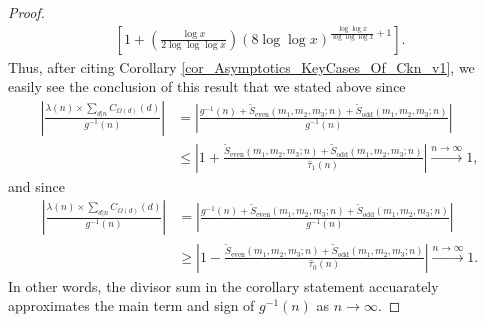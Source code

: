 \documentclass[11pt,reqno,a4letter]{article}
\numberwithin{figure}{section}
\numberwithin{table}{section}
\theoremstyle{plain}
\numberwithin{theorem}{section}
\theoremstyle{definition}
\begin{document}
\begin{proof}
\begin{align*}
     \left[1 + \left(\frac{\log x}{2 \log\log\log x}\right) 
     (8 \log\log x)^{\frac{\log\log x}{\log\log\log x} + 1}\right]. 
\end{align*} 
Thus, after citing Corollary \ref{cor_Asymptotics_KeyCases_Of_Ckn_v1}, we easily see the conclusion of this 
result that we stated above since 
\begin{align*} 
\left\lvert \frac{\lambda(n) \times \sum\limits_{d|n} C_{\Omega(d)}(d)}{g^{-1}(n)} \right\rvert & = 
     \left\lvert \frac{g^{-1}(n) + \widetilde{S}_{\operatorname{even}}(m_1, m_2, m_3; n) + 
     \widetilde{S}_{\operatorname{odd}}(m_1, m_2, m_3; n)}{g^{-1}(n)} \right\rvert \\ 
     & \leq \left\lvert 1 + \frac{\widetilde{S}_{\operatorname{even}}(m_1, m_2, m_3; n) + 
     \widetilde{S}_{\operatorname{odd}}(m_1, m_2, m_3; n)}{\widehat{\tau}_1(n)} \right\rvert 
     \xrightarrow{n \rightarrow \infty} 1, 
\end{align*} 
and since 
\begin{align*} 
\left\lvert \frac{\lambda(n) \times \sum\limits_{d|n} C_{\Omega(d)}(d)}{g^{-1}(n)} \right\rvert & = 
     \left\lvert \frac{g^{-1}(n) + \widetilde{S}_{\operatorname{even}}(m_1, m_2, m_3; n) + 
     \widetilde{S}_{\operatorname{odd}}(m_1, m_2, m_3; n)}{g^{-1}(n)} \right\rvert \\ 
     & \geq \left\lvert 1 - \frac{\widetilde{S}_{\operatorname{even}}(m_1, m_2, m_3; n) + 
     \widetilde{S}_{\operatorname{odd}}(m_1, m_2, m_3; n)}{\widehat{\tau}_0(n)} \right\rvert 
     \xrightarrow{n \rightarrow \infty} 1.  
\end{align*} 
In other words, the divisor sum in the corollary statement accuarately approximates the main term and 
sign of $g^{-1}(n)$ as $n \rightarrow \infty$. 
\end{proof} 
\end{document}
